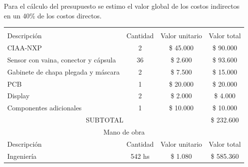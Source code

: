 \documentclass[
11pt, %
codirector, %
]{charter}
\begin{document}
Para el cálculo del presupuesto se estimo el valor global de los costos indirectos en un 40\% de los costos directos.  

\begin{table}[htpb]
\centering
\begin{tabularx}{\linewidth}{@{}|X|c|r|r|@{}}
\hline
\rowcolor[HTML]{C0C0C0} 
\multicolumn{4}{|c|}{\cellcolor[HTML]{C0C0C0}COSTOS DIRECTOS} \\ \hline
\rowcolor[HTML]{C0C0C0} 
\multicolumn{4}{|c|}{\cellcolor[HTML]{C0C0C0}Materiales} \\ \hline
\rowcolor[HTML]{C0C0C0} 
Descripción &
  \multicolumn{1}{c|}{\cellcolor[HTML]{C0C0C0}Cantidad} &
  \multicolumn{1}{c|}{\cellcolor[HTML]{C0C0C0}Valor unitario} &
  \multicolumn{1}{c|}{\cellcolor[HTML]{C0C0C0}Valor total} \\ \hline
 CIAA-NXP &
  \multicolumn{1}{c|}{2} &
  \multicolumn{1}{c|}{\$ 45.000} &
  \multicolumn{1}{c|}{\$ 90.000} \\ \hline
 Sensor con vaina, conector y cápsula &
  \multicolumn{1}{c|}{36} &
  \multicolumn{1}{c|}{\$ 2.600} &
  \multicolumn{1}{c|}{\$ 93.600} \\ \hline
  
 Gabinete de chapa plegada y máscara &
  \multicolumn{1}{c|}{2} &
  \multicolumn{1}{c|}{\$ 7.500} &
  \multicolumn{1}{c|}{\$ 15.000} \\ \hline
  
  PCB &
  \multicolumn{1}{c|}{1} &
  \multicolumn{1}{c|}{\$ 20.000} &
  \multicolumn{1}{c|}{\$ 20.000} \\ \hline
  
  Display &
  \multicolumn{1}{c|}{2} &
  \multicolumn{1}{c|}{\$ 2.000} &
  \multicolumn{1}{c|}{\$ 4.000} \\ \hline
  
  Componentes adicionales &
  \multicolumn{1}{c|}{1} &
  \multicolumn{1}{c|}{\$ 10.000} &
  \multicolumn{1}{c|}{\$ 10.000} \\ \hline
  

\multicolumn{3}{|c|}{SUBTOTAL} &
  \multicolumn{1}{c|}{\$ 232.600} \\ \hline
  
\multicolumn{4}{|c|}{\cellcolor[HTML]{C0C0C0}Mano de obra} \\ \hline
\rowcolor[HTML]{C0C0C0} 
Descripción &
  \multicolumn{1}{c|}{\cellcolor[HTML]{C0C0C0}Cantidad} &
  \multicolumn{1}{c|}{\cellcolor[HTML]{C0C0C0}Valor unitario} &
  \multicolumn{1}{c|}{\cellcolor[HTML]{C0C0C0}Valor total} \\ \hline
 Ingeniería &
  \multicolumn{1}{c|}{542 hs} &
  \multicolumn{1}{c|}{\$ 1.080} &
  \multicolumn{1}{c|}{\$ 585.360} \\ \hline
  

\end{tabularx}
\end{table}
\end{document}

